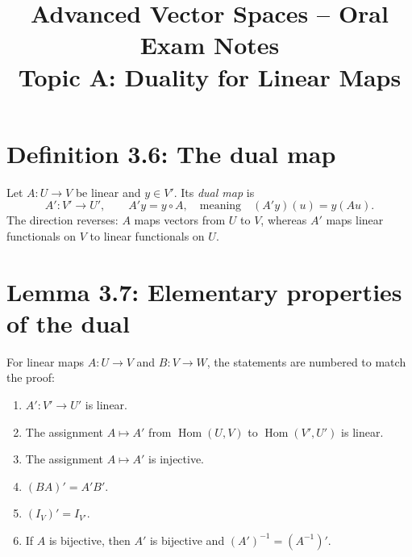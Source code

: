 \documentclass[11pt,a4paper]{article}
\title{Advanced Vector Spaces -- Oral Exam Notes\\Topic A: Duality for Linear Maps}
\author{}
\date{}
\begin{document}
\maketitle

\section{Definition 3.6: The dual map}
Let \(A:U\to V\) be linear and $y\in V'$. Its \emph{dual map} is
\[
 A':V'\longrightarrow U',\qquad A'y=y\circ A,
 \quad\text{meaning}\quad (A'y)(u)=y(Au).
\]
The direction reverses: \(A\) maps vectors from \(U\) to \(V\), whereas \(A'\) maps linear functionals on \(V\) to linear functionals on \(U\).

\section{Lemma 3.7: Elementary properties of the dual}
For linear maps \(A:U\to V\) and \(B:V\to W\), the statements are numbered to match the proof:
\begin{enumerate}
\item \(A':V'\to U'\) is linear.
\item The assignment \(A\mapsto A'\) from \(\operatorname{Hom}(U,V)\) to \(\operatorname{Hom}(V',U')\) is linear.
\item The assignment \(A\mapsto A'\) is injective.
\item \((BA)'=A'B'\).
\item \((I_V)'=I_{V'}\).
\item If \(A\) is bijective, then \(A'\) is bijective and \((A')^{-1}=(A^{-1})'\).
\end{enumerate}
\end{document}
